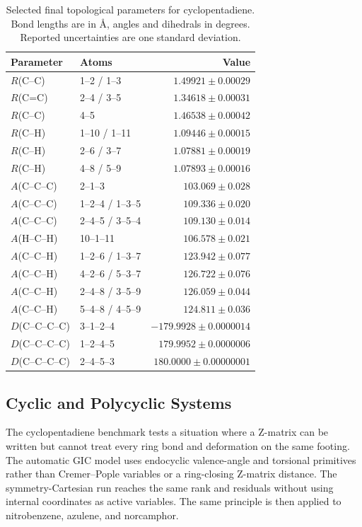 \documentclass[journal=jctcce,manuscript=article,maxauthors=999]{achemso}
\begin{document}
\begin{table}
\caption{Selected final topological parameters for cyclopentadiene. Bond lengths are in \AA, angles and dihedrals in degrees. Reported uncertainties are one standard deviation.}
\label{tab:cyclopentadiene-structure}
\begin{tabular}{llr}
\toprule
Parameter & Atoms & Value \\
\midrule
$R$(C--C) & 1--2 / 1--3 & $1.49921 \pm 0.00029$ \\
$R$(C=C) & 2--4 / 3--5 & $1.34618 \pm 0.00031$ \\
$R$(C--C) & 4--5 & $1.46538 \pm 0.00042$ \\
$R$(C--H) & 1--10 / 1--11 & $1.09446 \pm 0.00015$ \\
$R$(C--H) & 2--6 / 3--7 & $1.07881 \pm 0.00019$ \\
$R$(C--H) & 4--8 / 5--9 & $1.07893 \pm 0.00016$ \\
$A$(C--C--C) & 2--1--3 & $103.069 \pm 0.028$ \\
$A$(C--C--C) & 1--2--4 / 1--3--5 & $109.336 \pm 0.020$ \\
$A$(C--C--C) & 2--4--5 / 3--5--4 & $109.130 \pm 0.014$ \\
$A$(H--C--H) & 10--1--11 & $106.578 \pm 0.021$ \\
$A$(C--C--H) & 1--2--6 / 1--3--7 & $123.942 \pm 0.077$ \\
$A$(C--C--H) & 4--2--6 / 5--3--7 & $126.722 \pm 0.076$ \\
$A$(C--C--H) & 2--4--8 / 3--5--9 & $126.059 \pm 0.044$ \\
$A$(C--C--H) & 5--4--8 / 4--5--9 & $124.811 \pm 0.036$ \\
$D$(C--C--C--C) & 3--1--2--4 & $-179.9928 \pm 0.0000014$ \\
$D$(C--C--C--C) & 1--2--4--5 & $179.9952 \pm 0.0000006$ \\
$D$(C--C--C--C) & 2--4--5--3 & $180.0000 \pm 0.00000001$ \\
\bottomrule
\end{tabular}
\end{table}


\subsection{Cyclic and Polycyclic Systems}

The cyclopentadiene benchmark tests a situation where a Z-matrix can be written
but cannot treat every ring bond and deformation on the same footing. The
automatic GIC model uses endocyclic valence-angle and torsional primitives
rather than Cremer--Pople variables or a ring-closing Z-matrix distance. The
symmetry-Cartesian run reaches the same rank and residuals without using
internal coordinates as active variables. The same principle is then applied
to nitrobenzene, azulene, and norcamphor.
\end{document}
